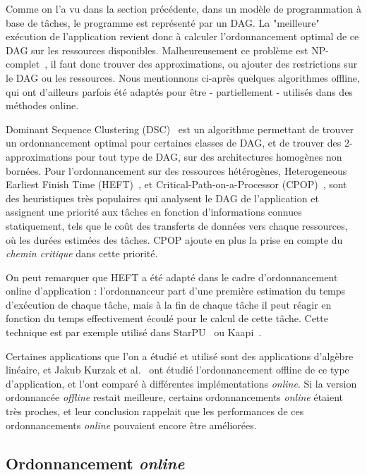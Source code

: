 Comme on l'a vu dans la section précédente, dans un modèle de programmation à base de tâches, le programme est représenté par un DAG.
La "meilleure" exécution de l'application revient donc à calculer l'ordonnancement optimal de ce DAG sur les ressources disponibles.
Malheureusement ce problème est NP-complet~\cite{Cook1971}, il faut donc trouver des approximations, ou ajouter des restrictions sur le DAG ou les ressources.
Nous mentionnons ci-après quelques algorithmes offline, qui ont d'ailleurs parfois été adaptés pour être - partiellement - utilisés dans des méthodes online.

Dominant Sequence Clustering (DSC)~\cite{Yang1994} est un algorithme permettant de trouver un ordonnancement optimal pour certaines classes de DAG, et de trouver des 2-approximations pour tout type de DAG, sur des architectures homogènes non bornées.
Pour l'ordonnancement sur des ressources hétérogènes, Heterogeneous Earliest Finish Time (HEFT)~\cite{HEFT}, et Critical-Path-on-a-Processor (CPOP)~\cite{HEFT}, sont des heuristiques très populaires qui analysent le DAG de l'application et assignent une priorité aux tâches en fonction d'informations connues statiquement, tels que le coût des transferts de données vers chaque ressources, où les durées estimées des tâches.
CPOP ajoute en plus la prise en compte du \emph{chemin critique} dans cette priorité.

On peut remarquer que HEFT a été adapté dans le cadre d'ordonnancement online d'application : l'ordonnanceur part d'une première estimation du temps d'exécution de chaque tâche, mais à la fin de chaque tâche il peut réagir en fonction du temps effectivement écoulé pour le calcul de cette tâche. Cette technique est par exemple utilisé dans StarPU~\cite{StarPU} ou Kaapi~\cite{Lima2015}.

Certaines applications que l'on a étudié et utilisé sont des applications d'algèbre linéaire, et Jakub Kurzak et al.~\cite{Kurzak2010} ont étudié l'ordonnancement offline de ce type d'application, et l'ont comparé à différentes implémentations \emph{online}.
Si la version ordonnancée \emph{offline} restait meilleure, certains ordonnancements \emph{online} étaient très proches, et leur conclusion rappelait que les performances de ces ordonnancements \emph{online} pouvaient encore être améliorées.



\subsection{Ordonnancement \emph{online}}

